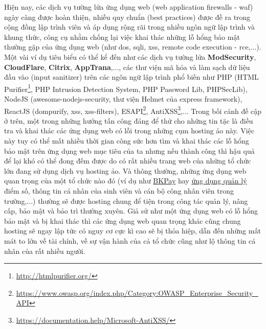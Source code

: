 Hiện nay, các dịch vụ tường lửa ứng dụng web (web application firewalls - \acrshort{waf}) ngày càng được hoàn thiện, nhiều quy chuẩn (best practices) được đề ra trong cộng đồng lập trình viên và áp dụng rộng rãi trong nhiều ngôn ngữ lập trình và khung thức, công cụ nhằm chống lại việc khai thác những lỗ hổng bảo mật thường gặp của ứng dụng web (như \acrshort{dos}, \acrshort{sqli}, \acrshort{xss}, remote code execution - \acrshort{rce},...). Một vài ví dụ tiêu biểu có thể kể đến như các dịch vụ tường lửa \textbf{ModSecurity}, \textbf{CloudFlare}, \textbf{Citrix}, \textbf{AppTrana},..., các thư viện mã hóa và làm sạch dữ liệu đầu vào (input sanitizer) trên các ngôn ngữ lập trình phổ biến như PHP (HTML Purifier\footnote{\href{http://htmlpurifier.org/}{http://htmlpurifier.org/}}, PHP Intrusion Detection System, PHP Password Lib, PHPSecLib), NodeJS (awesome-nodejs-security, thư viện Helmet của express framework), ReactJS (dompurify, xss, xss-filters), ESAPI\footnote{\href{https://www.owasp.org/index.php/Category:OWASP_Enterprise_Security_API}{https://www.owasp.org/index.php/Category:OWASP_Enterprise_Security_API}}, AntiXSS\footnote{\href{https://documentation.help/Microsoft-AntiXSS/}{https://documentation.help/Microsoft-AntiXSS/}},... Trong bối cảnh đề cập ở trên, một trong những hướng tấn công đáng để thử cho những tin tặc là điều tra và khai thác các ứng dụng web có lỗi trong những cụm hosting ảo này. Việc này tuy có thể mất nhiều thời gian công sức hơn tìm và khai thác các lỗ hổng bảo mật trên ứng dụng web mục tiêu của ta nhưng nếu thành công thì hậu quả để lại khó có thể đong đếm được do có rất nhiều trang web của những tổ chức lớn đang sử dụng dịch vụ hosting ảo. Và thông thường, những ứng dụng web quan trọng của một tổ chức nào đó (ví dụ như \href{https://bkpay.hcmut.edu.vn/bkpay/home.action}{BKPay} hay \href{https://mybk.hcmut.edu.vn/stinfo/}{ứng dụng quản lý} điểm số, thông tin cá nhân của sinh viên và cán bộ công nhân viên trong trường,...) thường sẽ được hosting chung để tiện trong công tác quản lý, nâng cấp, bảo mật và bảo trì thường xuyên. Giả sử như một ứng dụng web có lỗ hổng bảo mật và bị khai thác thì các ứng dụng web quan trọng khác cũng chung hosting sẽ ngay lập tức có nguy cơ cực kì cao sẽ bị thỏa hiệp, dẫn đến những mất mát to lớn về tài chính, về sự vận hành của cả tổ chức cũng như lộ thông tin cá nhân của rất nhiều người. \par
